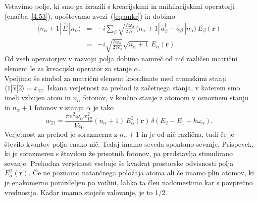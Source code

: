 Vstavimo polje, ki smo ga izrazili s kreacijskimi in anihilacijskimi operatorji (enačba~\ref{4.53}),
upoštevamo zvezi~(\ref{eq:ankr}) in dobimo
\begin{eqnarray}
\langle n_{\alpha}+1|\, \hat{E}\,|n_{\alpha}\rangle & = 
& -i\sum_{\beta}\sqrt{\frac{\hbar\omega_{\beta}}{2V\epsilon_{0}}}
\langle n_{\alpha}+1|\,\hat{a}_{\beta}^{\dagger}-\hat{a}_{\beta}\,|n_{\alpha}\rangle\, 
E_{\beta}(\mathbf{r})\nonumber \\
 & = & -i\sqrt{\frac{\hbar\omega_{\alpha}}{2V\epsilon_{0}}}
 \sqrt{n_{\alpha}+1}\, E_{\alpha}(\mathbf{r}).
\end{eqnarray}
Od vseh operatorjev v razvoju polja dobimo namreč od nič različen matrični
element le za kreacijski operator za stanje $\alpha$.\\

\noindent
Vpeljimo še simbol za matrični element koordinate med 
atomskimi stanji $\langle1|\hat{x}|2\rangle=x_{12}$. Iskana verjetnost za prehod iz 
začetnega stanja, v katerem smo imeli vzbujen atom in $n_{\alpha}$ fotonov, v končno
stanje z atomom v osnovnem stanju in $n_{\alpha}+1$ fotonov v stanju $\alpha$ je tako
\begin{equation}
w_{21}=\frac{\pi e^{2}\omega_{\alpha}x_{12}^{2}}{V\epsilon_{0}}
(n_{\alpha}+1)\,E_{\alpha}^{2}(\mathbf{r})\,\delta(E_{2}-E_{1}-\hbar\omega_{\alpha}).
\label{4.56}
\end{equation}
Verjetnost za prehod je sorazmerna z $n_{\alpha}+1$ in je od nič
različna, tudi če je število kvantov polja enako nič. Tedaj imamo seveda
spontano sevanje. Prispevek, ki je 
sorazmeren s številom že prisotnih fotonov, pa predstavlja stimulirano 
sevanje. Prehodna verjetnost vsebuje
še kvadrat prostorske odvisnosti polja $E_{\alpha}^{2}(\mathbf{r})$.
Če ne poznamo natančnega položaja atoma ali če imamo plin atomov, ki je enakomerno
porazdeljen po votlini, lahko ta člen nadomestimo kar s povprečno vrednostjo.
Kadar imamo stoječe valovanje, je to 1/2.\\

